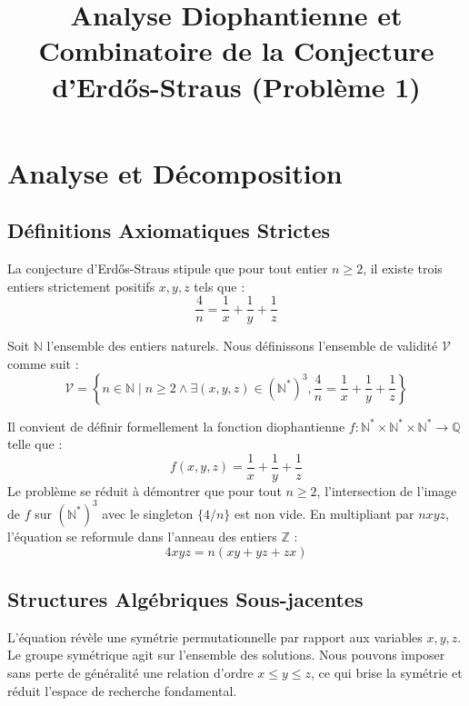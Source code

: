 \documentclass[12pt, a4paper]{article}
\title{Analyse Diophantienne et Combinatoire de la Conjecture d'Erd\H{o}s-Straus (Probl\`eme 1)}
\author{}
\date{}
\begin{document}
\maketitle
\tableofcontents
\newpage

\section{Analyse et D\'ecomposition}
\subsection{D\'efinitions Axiomatiques Strictes}
La conjecture d'Erd\H{o}s-Straus stipule que pour tout entier $n \ge 2$, il existe trois entiers strictement positifs $x, y, z$ tels que :
\begin{equation}
\frac{4}{n} = \frac{1}{x} + \frac{1}{y} + \frac{1}{z}
\end{equation}

Soit $\mathbb{N}$ l'ensemble des entiers naturels.
Nous d\'efinissons l'ensemble de validit\'e $\mathcal{V}$ comme suit :
\begin{equation}
\mathcal{V} = \left\{ n \in \mathbb{N} \mid n \ge 2 \land \exists (x, y, z) \in (\mathbb{N}^*)^3, \frac{4}{n} = \frac{1}{x} + \frac{1}{y} + \frac{1}{z} \right\}
\end{equation}

Il convient de d\'efinir formellement la fonction diophantienne $f : \mathbb{N}^* \times \mathbb{N}^* \times \mathbb{N}^* \to \mathbb{Q}$ telle que :
\begin{equation}
f(x, y, z) = \frac{1}{x} + \frac{1}{y} + \frac{1}{z}
\end{equation}
Le probl\`eme se r\'eduit \`a d\'emontrer que pour tout $n \ge 2$, l'intersection de l'image de $f$ sur $(\mathbb{N}^*)^3$ avec le singleton $\{4/n\}$ est non vide.
En multipliant par $nxyz$, l'\'equation se reformule dans l'anneau des entiers $\mathbb{Z}$ :
\begin{equation}
4xyz = n(xy + yz + zx)
\end{equation}

\subsection{Structures Alg\'ebriques Sous-jacentes}
L'\'equation r\'ev\`ele une sym\'etrie permutationnelle par rapport aux variables $x, y, z$. Le groupe sym\'etrique agit sur l'ensemble des solutions. Nous pouvons imposer sans perte de g\'en\'eralit\'e une relation d'ordre $x \le y \le z$, ce qui brise la sym\'etrie et r\'eduit l'espace de recherche fondamental.
\end{document}
